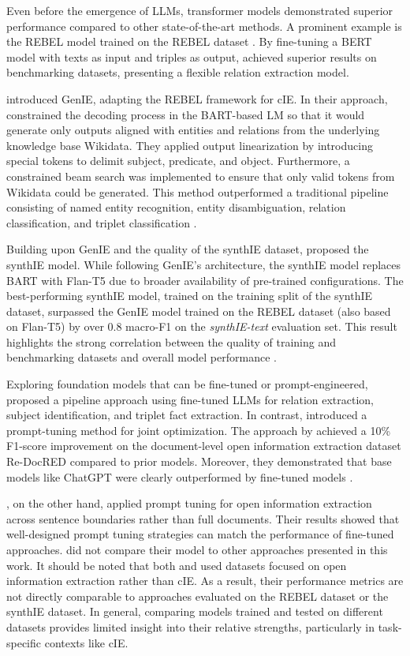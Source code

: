 \documentclass[a4paper,oneside,bibliography=totoc]{scrbook}
\begin{document}
Even before the emergence of \acp{LLM}, transformer models demonstrated superior performance compared to other state-of-the-art methods. A prominent example is the REBEL model trained on the REBEL dataset \cite{HuguetCabot2021}. By fine-tuning a BERT model with texts as input and triples as output, \citet{HuguetCabot2021} achieved superior results on benchmarking datasets, presenting a flexible relation extraction model.

\citet{Josifoski2021} introduced GenIE, adapting the REBEL framework for \ac{cIE}. In their approach, \citet{Josifoski2021} constrained the decoding process in the BART-based \ac{LM} so that it would generate only outputs aligned with entities and relations from the underlying knowledge base Wikidata. They applied output linearization by introducing special tokens to delimit subject, predicate, and object. Furthermore, a constrained beam search was implemented to ensure that only valid tokens from Wikidata could be generated. This method outperformed a traditional pipeline consisting of named entity recognition, entity disambiguation, relation classification, and triplet classification \cite{Josifoski2021}.

Building upon GenIE and the quality of the synthIE dataset, \citet{Josifoski2023} proposed the synthIE model. While following GenIE’s architecture, the synthIE model replaces BART with Flan-T5 due to broader availability of pre-trained configurations. The best-performing synthIE model, trained on the training split of the synthIE dataset, surpassed the GenIE model trained on the REBEL dataset (also based on Flan-T5) by over 0.8 macro-F1 on the \textit{synthIE-text} evaluation set. This result highlights the strong correlation between the quality of training and benchmarking datasets and overall model performance \cite{Josifoski2023}.

Exploring foundation models that can be fine-tuned or prompt-engineered, \citet{Xue2024} proposed a pipeline approach using fine-tuned \acp{LLM} for relation extraction, subject identification, and triplet fact extraction. In contrast, \citet{Chen2024} introduced a prompt-tuning method for joint optimization. The approach by \citet{Xue2024} achieved a 10\% F1-score improvement on the document-level open information extraction dataset Re-DocRED compared to prior models. Moreover, they demonstrated that base models like ChatGPT were clearly outperformed by fine-tuned models \cite{Xue2024}.

\citet{Chen2024}, on the other hand, applied prompt tuning for open information extraction across sentence boundaries rather than full documents. Their results showed that well-designed prompt tuning strategies can match the performance of fine-tuned approaches. \citet{Chen2024} did not compare their model to other approaches presented in this work. It should be noted that both \citet{Chen2024} and \citet{Xue2024} used datasets focused on open information extraction rather than \ac{cIE}. As a result, their performance metrics are not directly comparable to approaches evaluated on the REBEL dataset or the synthIE dataset. In general, comparing models trained and tested on different datasets provides limited insight into their relative strengths, particularly in task-specific contexts like \ac{cIE}.
\end{document}
